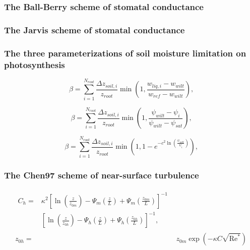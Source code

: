\documentclass[essd]{copernicus}
\begin{document}
\subsubsection{The Ball-Berry scheme of stomatal conductance}


\subsubsection{The Jarvis scheme of stomatal conductance}


\subsubsection{The three parameterizations of soil moisture limitation on photosynthesis}

\begin{equation}
    \beta = \sum_{i=1}^{N_{root}} \frac{\Delta z_{soil,i}}{z_{root}}
    \min\left(1, \frac{w_{liq,i} - w_{wilt}}{w_{ref} - w_{wilt}}\right)
    \text{,}
\end{equation}

\begin{equation}
    \beta = \sum_{i=1}^{N_{root}} \frac{\Delta z_{soil,i}}{z_{root}}
    \min\left(1, \frac{\psi_{wilt} - \psi_{i}}{\psi_{wilt} - \psi_{sat}}\right)
    \text{,}
\end{equation}

\begin{equation}
    \beta = \sum_{i=1}^{N_{root}} \frac{\Delta z_{soil,i}}{z_{root}}
    \min\left(1, 1 - e^{-c^2 \ln\left(\frac{\psi_{wilt}}{\psi_{i}} \right)} \right)
    \text{,}
\end{equation}


\subsubsection{The Chen97 scheme of near-surface turbulence}

\begin{align}
    \begin{split}
        C_h = & \kappa^2 \left[ \ln\left(\frac{z}{z_{0m}}\right)
            - \Psi_{m}\left(\frac{z}{L}\right)
            + \Psi_{m}\left(\frac{z_{0m}}{L}\right) \right]^{-1} \\
        & \left[ \ln\left(\frac{z}{z_{0h}}\right)
            - \Psi_{h}\left(\frac{z}{L}\right)
            + \Psi_{h}\left(\frac{z_{0h}}{L}\right) \right]^{-1} \text{,}
    \end{split}                                      \\
    z_{0h} = & z_{0m} \exp\left(-\kappa C \sqrt{\text{Re}^*}\right)
\end{align}
\end{document}
